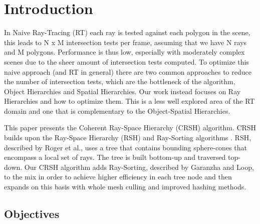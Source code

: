 
\chapter{Introduction}
\label{chapter:introduction}

In Naive Ray-Tracing (RT) each ray is tested against each polygon in the scene, this leads to N x M intersection tests per frame, assuming that we have N rays and M polygons. Performance is thus low, especially with moderately complex scenes due to the sheer amount of intersection tests computed. To optimize this naive approach (and RT in general) there are two common approaches to reduce the number of intersection tests, which are the bottleneck of the algorithm, Object Hierarchies and Spatial Hierarchies. Our work instead focuses on Ray Hierarchies and how to optimize them. This is a less well explored area of the RT domain and one that is complementary to the Object-Spatial Hierarchies.

This paper presents the Coherent Ray-Space Hierarchy (CRSH) algorithm. CRSH builds upon the Ray-Space Hierarchy (RSH) \cite{Roger07} and Ray-Sorting algorithms \cite{Garanzha10}. RSH, described by Roger et al., uses a tree that contains bounding sphere-cones that encompass a local set of rays. The tree is built bottom-up and traversed top-down. Our CRSH algorithm adds Ray-Sorting, described by Garanzha and Loop, to the mix in order to achieve higher efficiency in each tree node and then expands on this basis with whole mesh culling and improved hashing methods.

\section{Objectives}
\label{section:objectives}

